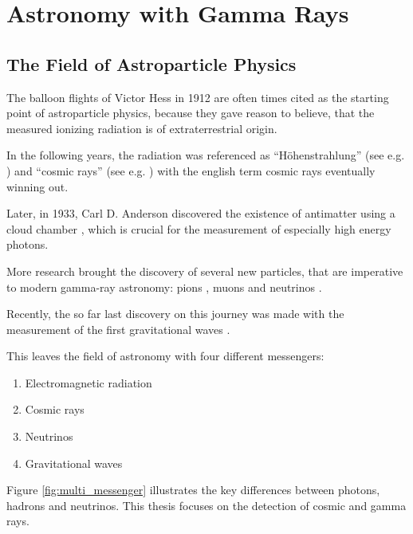 \chapter{Astronomy with Gamma Rays}

\section{The Field of Astroparticle Physics}

The balloon flights of Victor Hess in 1912 \cite{Hess:1912srp} are
often times cited as the starting point of astroparticle physics,
because they gave reason to believe, that the measured ionizing
radiation is of extraterrestrial origin. 

In the following years, the radiation was referenced as \enquote{Höhenstrahlung} 
(see e.g. \cite{myssowsky1926versuche}) 
and \enquote{cosmic rays} (see e.g. \cite{millikan1928origin}) with 
the english term cosmic rays eventually winning out.

Later, in 1933, Carl D. Anderson discovered the existence
of antimatter using a cloud chamber \cite{PhysRev.43.491},
which is crucial for the measurement of especially
high energy photons.

More research brought the discovery of several new particles,
that are imperative to modern gamma-ray astronomy:
pions \cite{LATTES1947}, muons \cite{PhysRev.52.1003}
and neutrinos \cite{Cowan103}.

Recently, the so far last discovery on this journey
was made with the measurement of the first gravitational 
waves \cite{PhysRevLett.118.221101}.

This leaves the field of astronomy with four different
messengers:
\begin{enumerate}
	\item Electromagnetic radiation
	\item Cosmic rays
	\item Neutrinos
	\item Gravitational waves
\end{enumerate}

Figure \ref{fig:multi_messenger} illustrates the key differences between
photons, hadrons and neutrinos.
This thesis focuses on the detection of cosmic and gamma rays.


